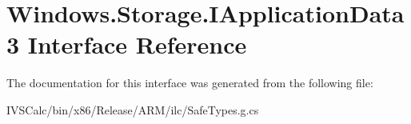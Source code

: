 \hypertarget{interface_windows_1_1_storage_1_1_i_application_data3}{}\section{Windows.\+Storage.\+I\+Application\+Data3 Interface Reference}
\label{interface_windows_1_1_storage_1_1_i_application_data3}


The documentation for this interface was generated from the following file\+:\begin{DoxyCompactItemize}
\item 
I\+V\+S\+Calc/bin/x86/\+Release/\+A\+R\+M/ilc/Safe\+Types.\+g.\+cs\end{DoxyCompactItemize}
